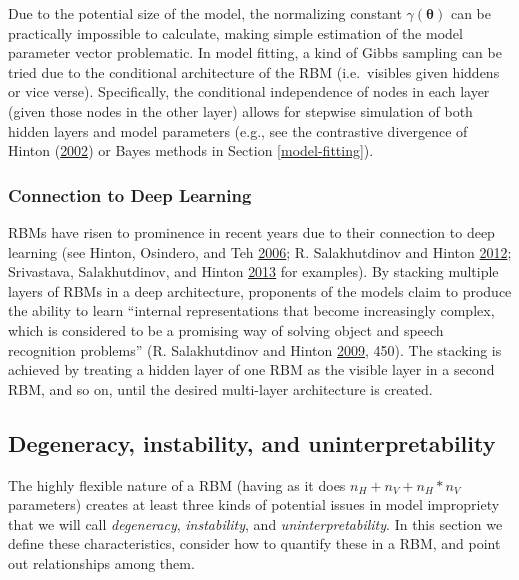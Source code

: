 \documentclass[12pt]{article}
\theoremstyle{definition}
\newcommand{\nv}{{n_{\scriptscriptstyle V}}}
\newcommand{\nh}{{n_{\scriptscriptstyle H}}}
\begin{document}
Due to the potential size of the model, the normalizing constant
\(\gamma(\boldsymbol \theta)\) can be practically impossible to
calculate, making simple estimation of the model parameter vector
problematic. In model fitting, a kind of Gibbs sampling can be tried due
to the conditional architecture of the RBM (i.e.~visibles given hiddens
or vice verse). Specifically, the conditional independence of nodes in
each layer (given those nodes in the other layer) allows for stepwise
simulation of both hidden layers and model parameters (e.g., see the
contrastive divergence of Hinton
(\protect\hyperlink{ref-hinton2002training}{2002}) or Bayes methods in
Section \ref{model-fitting}).

\subsubsection{Connection to Deep
Learning}\label{connection-to-deep-learning}

RBMs have risen to prominence in recent years due to their connection to
deep learning (see Hinton, Osindero, and Teh
\protect\hyperlink{ref-hinton2006fast}{2006}; R. Salakhutdinov and
Hinton \protect\hyperlink{ref-salakhutdinov2012efficient}{2012};
Srivastava, Salakhutdinov, and Hinton
\protect\hyperlink{ref-srivastava2013modeling}{2013} for examples). By
stacking multiple layers of RBMs in a deep architecture, proponents of
the models claim to produce the ability to learn ``internal
representations that become increasingly complex, which is considered to
be a promising way of solving object and speech recognition problems''
(R. Salakhutdinov and Hinton
\protect\hyperlink{ref-salakhutdinov2009deep}{2009}, 450). The stacking
is achieved by treating a hidden layer of one RBM as the visible layer
in a second RBM, and so on, until the desired multi-layer architecture
is created.

\subsection{Degeneracy, instability, and
uninterpretability}\label{degeneracy-instability-and-uninterpretability}

The highly flexible nature of a RBM (having as it does
\(\nh + \nv + \nh*\nv\) parameters) creates at least three kinds of
potential issues in model impropriety that we will call
\emph{degeneracy}, \emph{instability}, and \emph{uninterpretability}. In
this section we define these characteristics, consider how to quantify
these in a RBM, and point out relationships among them.
\end{document}
